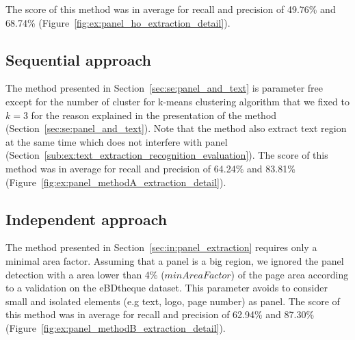 The score of this method was in average for recall and precision of 49.76\% and 68.74\% (Figure~\ref{fig:ex:panel_ho_extraction_detail}).


\subsection{Sequential approach} %
\label{sub:ex:panel_extraction_rigaud_method_A}

The method presented in Section~\ref{sec:se:panel_and_text} is parameter free except for the number of cluster for k-means clustering algorithm that we fixed to $k=3$ for the reason explained in the presentation of the method (Section~\ref{sec:se:panel_and_text}).
Note that the method also extract text region at the same time which does not interfere with panel (Section~\ref{sub:ex:text_extraction_recognition_evaluation}).
The score of this method  was in average for recall and precision of 64.24\% and 83.81\% (Figure~\ref{fig:ex:panel_methodA_extraction_detail}).


\subsection{Independent approach} %
The method presented in Section~\ref{sec:in:panel_extraction} requires only a minimal area factor.
Assuming that a panel is a big region, we ignored the panel detection with a area lower than 4\% ($minAreaFactor$) of the page area according to a validation on the eBDtheque dataset.
This parameter avoids to consider small and isolated elements (e.g text, logo, page number) as panel.
The score of this method was in average for recall and precision of 62.94\% and 87.30\% (Figure~\ref{fig:ex:panel_methodB_extraction_detail}).

